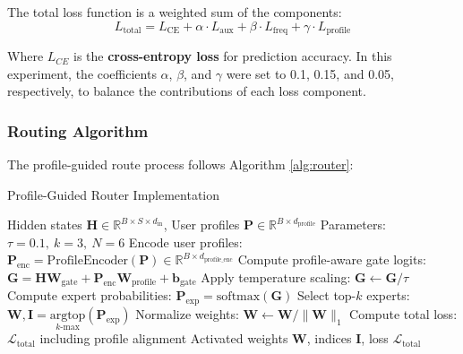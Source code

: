 \documentclass[preprint,12pt]{elsarticle}
\begin{document}
The total loss function is a weighted sum of the components:
\begin{equation}
L_{\text{total}} = L_{\text{CE}} + \alpha \cdot L_{\text{aux}} + \beta \cdot L_{\text{freq}} + \gamma \cdot L_{\text{profile}}
\end{equation}

Where $L_{CE}$ is the \textbf{cross-entropy loss} for prediction accuracy. In this experiment, the coefficients $\alpha$, $\beta$, and $\gamma$ were set to 0.1, 0.15, and 0.05, respectively, to balance the contributions of each loss component.

\subsubsection{Routing Algorithm}
The profile-guided route process follows Algorithm \ref{alg:router}:
\begin{algorithm}
\caption{Profile-Guided Router Implementation}
\label{alg:router}
\begin{algorithmic}[1]
\REQUIRE Hidden states $\mathbf{H} \in \mathbb{R}^{B \times S \times d_{\text{in}}}$, User profiles $\mathbf{P} \in \mathbb{R}^{B \times d_{\text{profile}}}$
\REQUIRE Parameters: $\tau=0.1,\ k=3,\ N=6$
\STATE Encode user profiles: 
   $\mathbf{P}_{\text{enc}} = \text{ProfileEncoder}(\mathbf{P}) \in \mathbb{R}^{B \times d_{\text{profile\_enc}}}$
\STATE Compute profile-aware gate logits: 
   $\mathbf{G} = \mathbf{H}\mathbf{W}_{\text{gate}} + \mathbf{P}_{\text{enc}}\mathbf{W}_{\text{profile}} + \mathbf{b}_{\text{gate}}$
\STATE Apply temperature scaling: 
   $\mathbf{G} \leftarrow \mathbf{G}/\tau$
\STATE Compute expert probabilities: 
   $\mathbf{P}_{\text{exp}} = \text{softmax}(\mathbf{G})$
\STATE Select top-$k$ experts: 
   $\mathbf{W}, \mathbf{I} = \underset{k\text{-max}}{\text{argtop}}(\mathbf{P}_{\text{exp}})$
\STATE Normalize weights: 
   $\mathbf{W} \leftarrow \mathbf{W}/\|\mathbf{W}\|_1$
\STATE Compute total loss: $\mathcal{L}_{\text{total}}$ including profile alignment
\ENSURE Activated weights $\mathbf{W}$, indices $\mathbf{I}$, loss $\mathcal{L}_{\text{total}}$
\end{algorithmic}
\end{algorithm}
\end{document}
